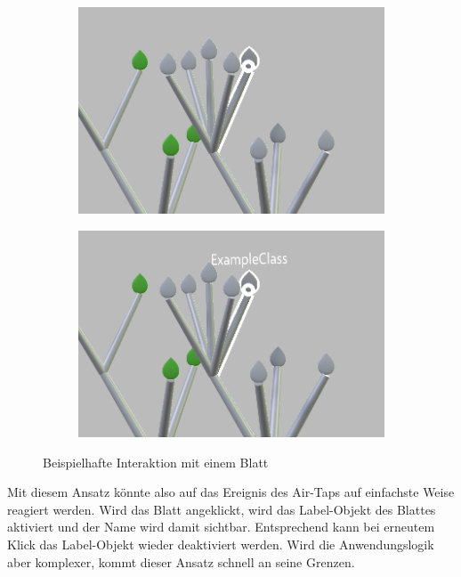 \setlength{\fwidth}{.49\textwidth}
\begin{figure}[htb]
  \centering
  \begin{subfigure}[b]{\fwidth}
   \includegraphics[width=\textwidth]{figures/leaf-focused}
    \label{fig:leaf-focused}
  \end{subfigure}
  \hfill
  \begin{subfigure}[b]{\fwidth}
  	\includegraphics[width=\textwidth]{figures/leaf-clicked}
  	 \label{fig:leaf-clicked}
  \end{subfigure}
  \caption{Beispielhafte Interaktion mit einem Blatt} \label{fig:leaf-interaction}
\end{figure}

Mit diesem Ansatz könnte also auf das Ereignis des Air-Taps auf einfachste Weise reagiert werden. Wird das Blatt angeklickt, wird das Label-Objekt des Blattes aktiviert und der Name wird damit sichtbar. Entsprechend kann bei erneutem Klick das Label-Objekt wieder deaktiviert werden. Wird die Anwendungslogik aber komplexer, kommt dieser Ansatz schnell an seine Grenzen.

